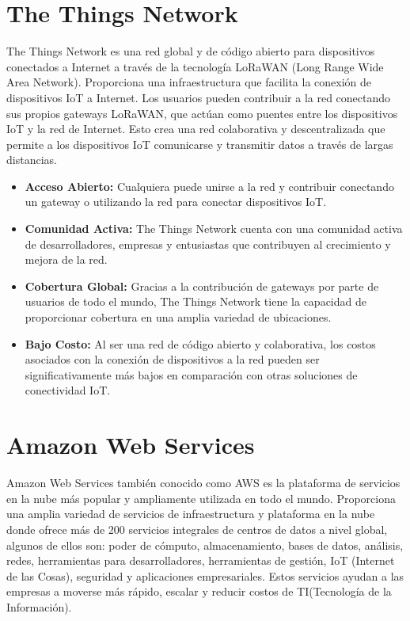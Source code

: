 \section{The Things Network}
The Things Network \cite{gutierrez2011aplicacion} es una red global y de código abierto para dispositivos conectados a Internet a través de la tecnología LoRaWAN (Long Range Wide Area Network). 
Proporciona una infraestructura que facilita la conexión de dispositivos IoT a Internet. Los usuarios pueden contribuir a la red conectando sus propios gateways LoRaWAN, que actúan como puentes entre los dispositivos IoT y la red de Internet. Esto crea una red colaborativa y descentralizada que permite a los dispositivos IoT comunicarse y transmitir datos a través de largas distancias.
\begin{itemize}
    \item \textbf{Acceso Abierto:} Cualquiera puede unirse a la red y contribuir conectando un gateway o utilizando la red para conectar dispositivos IoT.
    \item \textbf{Comunidad Activa:} The Things Network cuenta con una comunidad activa de desarrolladores, empresas y entusiastas que contribuyen al crecimiento y mejora de la red.
    \item \textbf{Cobertura Global:} Gracias a la contribución de gateways por parte de usuarios de todo el mundo, The Things Network tiene la capacidad de proporcionar cobertura en una amplia variedad de ubicaciones.
    \item \textbf{Bajo Costo:} Al ser una red de código abierto y colaborativa, los costos asociados con la conexión de dispositivos a la red pueden ser significativamente más bajos en comparación con otras soluciones de conectividad IoT.
\end{itemize}

\section{Amazon Web Services}
Amazon Web Services también conocido como AWS \cite{gutierrez2011aplicacion} es la plataforma de servicios en la nube más popular y ampliamente utilizada en todo el mundo. Proporciona una amplia variedad de servicios de infraestructura y plataforma en la nube donde ofrece más de 200 servicios integrales de centros de datos a nivel global, algunos de ellos son: poder de cómputo, almacenamiento, bases de datos, análisis, redes, herramientas para desarrolladores, herramientas de gestión, IoT (Internet de las Cosas), seguridad y aplicaciones empresariales. Estos servicios ayudan a las empresas a moverse más rápido, escalar y reducir costos de TI(Tecnología de la Información).

